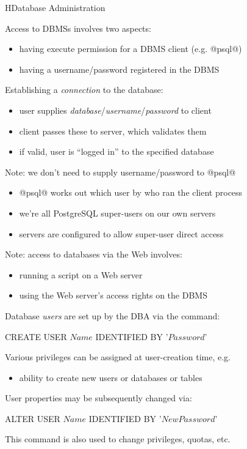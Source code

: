 \begin{lecture}{H}{Database Administration}
\begin{slide}
Access to DBMSs involves two aspects:
\begin{itemize}
\item having execute permission for a DBMS client {\small (e.g. @psql@)}
\item having a username/password registered in the DBMS
\end{itemize}
Establishing a {\em{connection}} to the database:
\begin{itemize}
\item user supplies {\em{database}}/{\em{username}}/{\em{password}} to client
\item client passes these to server, which validates them
\item if valid, user is ``logged in'' to the specified database
\end{itemize}
\end{slide}

\begin{slide}
Note: we don't need to supply username/password to @psql@
\begin{itemize}
\item @psql@ works out which user by who ran the client process
\item we're all PostgreSQL super-users on our own servers
\item servers are configured to allow super-user direct access
\end{itemize}

Note: access to databases via the Web involves:
\begin{itemize}
\item running a script on a Web server
\item using the Web server's access rights on the DBMS
\end{itemize}
\end{slide}

\begin{slide}
Database {\em{users}} are set up by the DBA via the command:
\begin{syntax}
    CREATE USER \(Name\) IDENTIFIED BY '\(Password\)'
\end{syntax}
Various privileges can be assigned at user-creation time, e.g.
\begin{itemize}
\item ability to create new users or databases or tables
\end{itemize}
User properties may be subsequently changed via:
\begin{syntax}
    ALTER USER \(Name\) IDENTIFIED BY '\(NewPassword\)'
\end{syntax}
This command is also used to change privileges, quotas, etc.
\end{slide}


\end{lecture}
